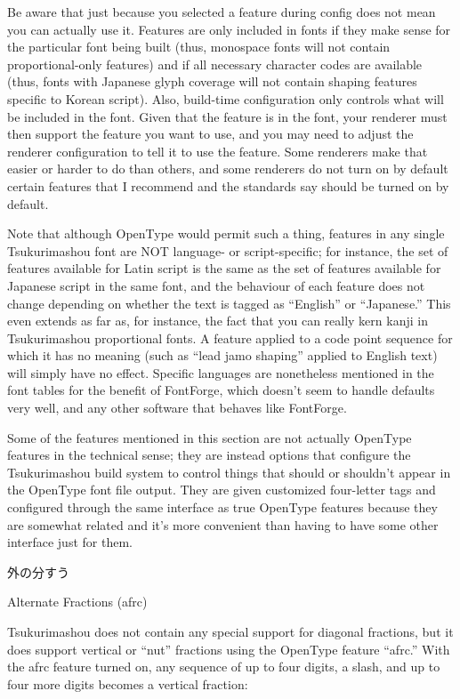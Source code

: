 \documentclass[14pt]{extarticle}
\newcommand{\blsubsection}[2]{%
\kaku\large#1\qquad\phantomsection%
\addcontentsline{toc}{subsection}{#1 #2}%
#2\par\addpenalty{-300}\normalsize}
\begin{document}
Be aware that just because you selected a feature during config does not
mean you can actually use it.  Features are only included in fonts if they
make sense for the particular font being built (thus, monospace fonts will
not contain proportional-only features) and if all necessary character codes
are available (thus, fonts with Japanese glyph coverage will not contain
shaping features specific to Korean script).  Also, build-time configuration
only controls what will be included in the font.  Given that the feature is
in the font, your renderer must then support the feature you want to use,
and you may need to adjust the renderer configuration to tell it to use the
feature.  Some renderers make that easier or harder to do than others, and
some renderers do not turn on by default certain features that I recommend
and the standards say should be turned on by default.

Note that although OpenType would permit such a thing, features in any
single Tsukurimashou font are NOT language- or script-specific; for
instance, the set of features available for Latin script is the same as the
set of features available for Japanese script in the same font, and the
behaviour of each feature does not change depending on whether the text is
tagged as ``English'' or ``Japanese.'' This even extends as far as, for
instance, the fact that you can really kern kanji in Tsukurimashou
proportional fonts.  A feature applied to a code point sequence for which it
has no meaning (such as ``lead jamo shaping'' applied to English text) will
simply have no effect.  Specific languages are nonetheless mentioned in the
font tables for the benefit of FontForge, which doesn't seem to handle
defaults very well, and any other software that behaves like FontForge.

Some of the features mentioned in this section are not actually OpenType
features in the technical sense; they are instead options that configure the
Tsukurimashou build system to control things that should or shouldn't appear
in the OpenType font file output.  They are given customized four-letter
tags and configured through the same interface as true OpenType features
because they are somewhat related and it's more convenient than having to
have some other interface just for them.


\blsubsection{外の分すう}{Alternate Fractions (afrc)}

Tsukurimashou does not contain any special support for diagonal fractions,
but it does support vertical or ``nut'' fractions using the OpenType feature
``afrc.'' With the afrc feature turned on, any sequence of up to four
digits, a slash, and up to four more digits becomes a vertical fraction:
\end{document}
